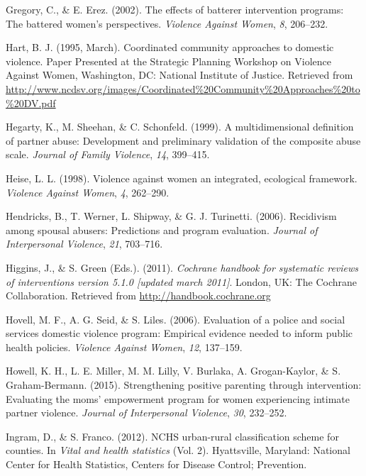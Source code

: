 \documentclass[11pt,]{tufte-book}
\begin{document}
\hypertarget{ref-gregory2002effects}{}
Gregory, C., \& E. Erez. (2002). The effects of batterer intervention
programs: The battered women's perspectives. \emph{Violence Against
Women}, \emph{8}, 206--232.

\hypertarget{ref-hart1995coordinated}{}
Hart, B. J. (1995, March). Coordinated community approaches to domestic
violence. Paper Presented at the Strategic Planning Workshop on Violence
Against Women, Washington, DC: National Institute of Justice. Retrieved
from
\url{http://www.ncdsv.org/images/Coordinated\%20Community\%20Approaches\%20to\%20DV.pdf}

\hypertarget{ref-hegarty1999multidimensional}{}
Hegarty, K., M. Sheehan, \& C. Schonfeld. (1999). A multidimensional
definition of partner abuse: Development and preliminary validation of
the composite abuse scale. \emph{Journal of Family Violence}, \emph{14},
399--415.

\hypertarget{ref-heise1998violence}{}
Heise, L. L. (1998). Violence against women an integrated, ecological
framework. \emph{Violence Against Women}, \emph{4}, 262--290.

\hypertarget{ref-hendricks2006recidivism}{}
Hendricks, B., T. Werner, L. Shipway, \& G. J. Turinetti. (2006).
Recidivism among spousal abusers: Predictions and program evaluation.
\emph{Journal of Interpersonal Violence}, \emph{21}, 703--716.

\hypertarget{ref-higgins2011cochrane}{}
Higgins, J., \& S. Green (Eds.). (2011). \emph{Cochrane handbook for
systematic reviews of interventions version 5.1.0 {[}updated march
2011{]}}. London, UK: The Cochrane Collaboration. Retrieved from
\url{http://handbook.cochrane.org}

\hypertarget{ref-hovell2006evaluation}{}
Hovell, M. F., A. G. Seid, \& S. Liles. (2006). Evaluation of a police
and social services domestic violence program: Empirical evidence needed
to inform public health policies. \emph{Violence Against Women},
\emph{12}, 137--159.

\hypertarget{ref-howell2015strengthening}{}
Howell, K. H., L. E. Miller, M. M. Lilly, V. Burlaka, A. Grogan-Kaylor,
\& S. Graham-Bermann. (2015). Strengthening positive parenting through
intervention: Evaluating the moms' empowerment program for women
experiencing intimate partner violence. \emph{Journal of Interpersonal
Violence}, \emph{30}, 232--252.

\hypertarget{ref-ingram2012nchs}{}
Ingram, D., \& S. Franco. (2012). NCHS urban-rural classification scheme
for counties. In \emph{Vital and health statistics} (Vol. 2).
Hyattsville, Maryland: National Center for Health Statistics, Centers
for Disease Control; Prevention.
\end{document}
